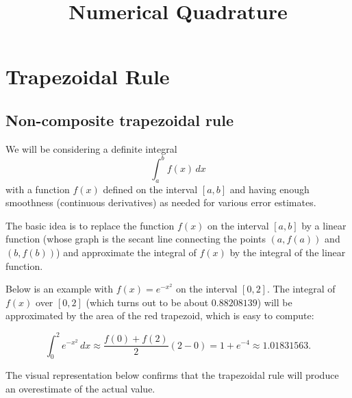 \documentclass[11pt]{article}
\title{Numerical Quadrature}
\begin{document}
    
    
    \maketitle
    
    

    
    \section{Trapezoidal Rule}\label{trapezoidal-rule}

\subsection{Non-composite trapezoidal
rule}\label{non-composite-trapezoidal-rule}

We will be considering a definite integral
\[\displaystyle\int_a^b f(x)\,dx\] with a function \(f(x)\) defined on
the interval \([a,b]\) and having enough smoothness (continuous
derivatives) as needed for various error estimates.

The basic idea is to replace the function \(f(x)\) on the interval
\([a,b]\) by a linear function (whose graph is the secant line
connecting the points \((a,f(a))\) and \((b,f(b))\)) and approximate the
integral of \(f(x)\) by the integral of the linear function.

Below is an example with \(f(x)=e^{-x^2}\) on the interval \([0,2]\).
The integral of \(f(x)\) over \([0,2]\) (which turns out to be about
\(0.88208139\)) will be approximated by the area of the red trapezoid,
which is easy to compute:

\begin{equation*}
  \int_0^2 e^{-x^2}\,dx
  \approx
  \frac{f(0)+f(2)}{2}(2-0)
  =
  1+e^{-4}
  \approx
  1.01831563.
\end{equation*}

The visual representation below confirms that the trapezoidal rule will
produce an overestimate of the actual value.
\end{document}
